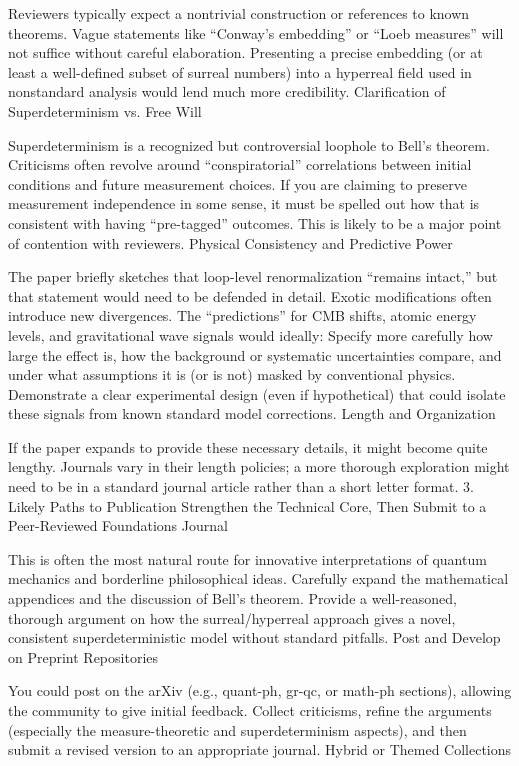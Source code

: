 Reviewers typically expect a nontrivial construction or references to known theorems. Vague statements like “Conway’s embedding” or “Loeb measures” will not suffice without careful elaboration.
Presenting a precise embedding (or at least a well-defined subset of surreal numbers) into a hyperreal field used in nonstandard analysis would lend much more credibility.
Clarification of Superdeterminism vs. Free Will

Superdeterminism is a recognized but controversial loophole to Bell’s theorem. Criticisms often revolve around “conspiratorial” correlations between initial conditions and future measurement choices.
If you are claiming to preserve measurement independence in some sense, it must be spelled out how that is consistent with having “pre-tagged” outcomes. This is likely to be a major point of contention with reviewers.
Physical Consistency and Predictive Power

The paper briefly sketches that loop-level renormalization “remains intact,” but that statement would need to be defended in detail. Exotic modifications often introduce new divergences.
The “predictions” for CMB shifts, atomic energy levels, and gravitational wave signals would ideally:
Specify more carefully how large the effect is, how the background or systematic uncertainties compare, and under what assumptions it is (or is not) masked by conventional physics.
Demonstrate a clear experimental design (even if hypothetical) that could isolate these signals from known standard model corrections.
Length and Organization

If the paper expands to provide these necessary details, it might become quite lengthy. Journals vary in their length policies; a more thorough exploration might need to be in a standard journal article rather than a short letter format.
3. Likely Paths to Publication
Strengthen the Technical Core, Then Submit to a Peer-Reviewed Foundations Journal

This is often the most natural route for innovative interpretations of quantum mechanics and borderline philosophical ideas.
Carefully expand the mathematical appendices and the discussion of Bell’s theorem.
Provide a well-reasoned, thorough argument on how the surreal/hyperreal approach gives a novel, consistent superdeterministic model without standard pitfalls.
Post and Develop on Preprint Repositories

You could post on the arXiv (e.g., quant-ph, gr-qc, or math-ph sections), allowing the community to give initial feedback.
Collect criticisms, refine the arguments (especially the measure-theoretic and superdeterminism aspects), and then submit a revised version to an appropriate journal.
Hybrid or Themed Collections

